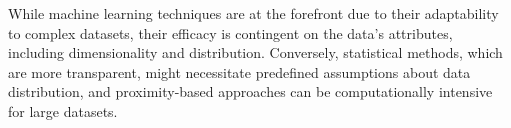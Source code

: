 \documentclass[sigplan,screen]{acmart}
\begin{document}
    While machine learning techniques are at the forefront due to their adaptability to complex datasets, their efficacy is contingent on the data's attributes, including dimensionality and distribution. Conversely, statistical methods, which are more transparent, might necessitate predefined assumptions about data distribution, and proximity-based approaches can be computationally intensive for large datasets.
    
\end{document}
